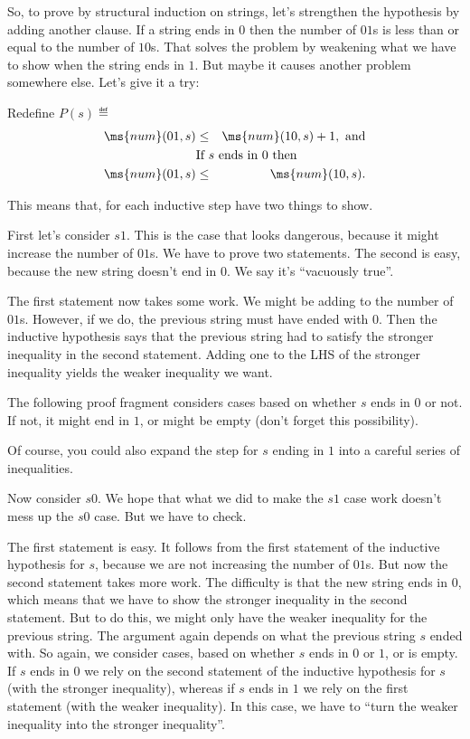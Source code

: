 \begin{definition}
\begin{editingnotes}
So, to prove by structural induction on strings, let's strengthen the
hypothesis by adding another clause.  If a string ends in $0$ then
the number of $01$s is less than or equal to the number of $10$s.
That solves the problem by weakening what we have to show when the
string ends in $1$.  But maybe it causes another problem somewhere
else.  Let's give it a try:

Redefine $P(s) \eqdef$
\begin{eqnarray*}
\ms{num}(01,s) & \leq & \ms{num}(10,s) + 1, \text{ and}\\
\lefteqn{\text{If $s$ ends in $0$ then}}\\
\ms{num}(01,s) & \leq  &\ms{num}(10,s).
\end{eqnarray*} 
 
This means that, for each inductive step have two things to show.

First let's consider $s1$. This is the case that looks dangerous,
because it might increase the number of $01$s.  We have to prove two
statements.  The second is easy, because the new string doesn't end in
$0$.  We say it's ``vacuously true''.

The first statement now takes some work. 
We might be adding to the number of $01$s.  
However, if we do, the previous string must have ended with $0$. 
Then the inductive hypothesis says that the previous string had to
satisfy the stronger inequality in the second statement. 
Adding one to the LHS of the stronger inequality yields the weaker
inequality we want.

The following proof fragment considers cases based on whether $s$ ends
in $0$ or not.  If not, it might end in $1$, or might be empty (don't
forget this possibility).

Of course, you could also expand the step for $s$ ending in $1$ into a
careful series of inequalities.

Now consider $s0$.  We hope that what we did to make the $s1$ case
work doesn't mess up the $s0$ case.  But we have to check.

The first statement is easy.  It follows from the first statement of
the inductive hypothesis for $s$, because we are not increasing the
number of $01$s.  But now the second statement takes more work.  The
difficulty is that the new string ends in $0$, which means that we
have to show the stronger inequality in the second statement.  But to
do this, we might only have the weaker inequality for the previous
string.  The argument again depends on what the previous string $s$
ended with.  So again, we consider cases, based on whether $s$ ends in
$0$ or $1$, or is empty.  If $s$ ends in $0$ we rely on the second
statement of the inductive hypothesis for $s$ (with the stronger
inequality), whereas if $s$ ends in $1$ we rely on the first statement
(with the weaker inequality).  In this case, we have to ``turn the
weaker inequality into the stronger inequality''.


\end{editingnotes}
\end{definition}
